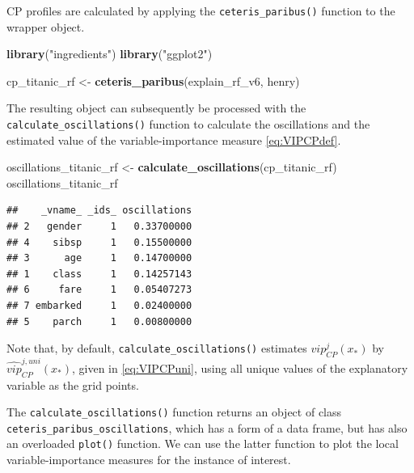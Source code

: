 \documentclass[12pt,]{krantz}
\newenvironment{Shaded}{\begin{snugshade}}{\end{snugshade}}
\newcommand{\DataTypeTok}[1]{\textcolor[rgb]{0.13,0.29,0.53}{#1}}
\newcommand{\KeywordTok}[1]{\textcolor[rgb]{0.13,0.29,0.53}{\textbf{#1}}}
\newcommand{\NormalTok}[1]{#1}
\newcommand{\OperatorTok}[1]{\textcolor[rgb]{0.81,0.36,0.00}{\textbf{#1}}}
\newcommand{\StringTok}[1]{\textcolor[rgb]{0.31,0.60,0.02}{#1}}
\theoremstyle{definition}
\theoremstyle{definition}
\theoremstyle{definition}
\theoremstyle{remark}
\begin{document}
CP profiles are calculated by applying the \texttt{ceteris\_paribus()}
function to the wrapper object.

\begin{Shaded}
\begin{Highlighting}[]
\KeywordTok{library}\NormalTok{(}\StringTok{"ingredients"}\NormalTok{)}
\KeywordTok{library}\NormalTok{(}\StringTok{"ggplot2"}\NormalTok{)}

\NormalTok{cp_titanic_rf <-}\StringTok{ }\KeywordTok{ceteris_paribus}\NormalTok{(explain_rf_v6, henry)}
\end{Highlighting}
\end{Shaded}

The resulting object can subsequently be processed with the
\texttt{calculate\_oscillations()} function to calculate the
oscillations and the estimated value of the variable-importance measure
\eqref{eq:VIPCPdef}.

\begin{Shaded}
\begin{Highlighting}[]
\NormalTok{oscillations_titanic_rf <-}\StringTok{ }\KeywordTok{calculate_oscillations}\NormalTok{(cp_titanic_rf)}
\NormalTok{oscillations_titanic_rf}
\end{Highlighting}
\end{Shaded}

\begin{verbatim}
##    _vname_ _ids_ oscillations
## 2   gender     1   0.33700000
## 4    sibsp     1   0.15500000
## 3      age     1   0.14700000
## 1    class     1   0.14257143
## 6     fare     1   0.05407273
## 7 embarked     1   0.02400000
## 5    parch     1   0.00800000
\end{verbatim}

Note that, by default, \texttt{calculate\_oscillations()} estimates
\(vip_{CP}^j(x_*)\) by \(\widehat{vip}_{CP}^{j,uni}(x_*)\), given in
\eqref{eq:VIPCPuni}, using all unique values of the explanatory variable
as the grid points.

The \texttt{calculate\_oscillations()} function returns an object of
class \texttt{ceteris\_paribus\_oscillations}, which has a form of a
data frame, but has also an overloaded \texttt{plot()} function. We can
use the latter function to plot the local variable-importance measures
for the instance of interest.

\begin{Shaded}
\end{Shaded}
\end{document}
